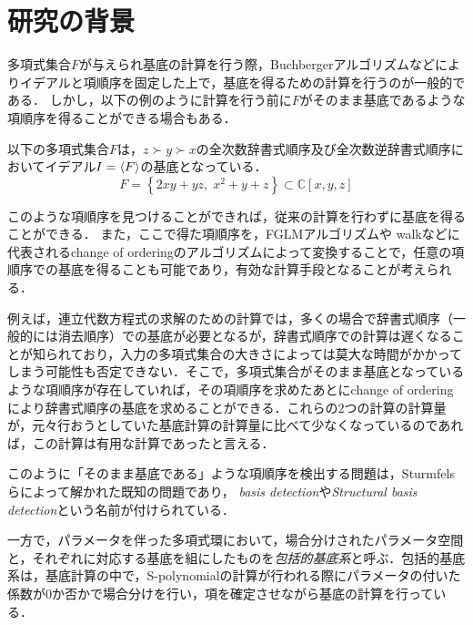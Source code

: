 \section{研究の背景}
多項式集合$F$が与えられ\groebner{}基底の計算を行う際，Buchbergerアルゴリズム\cite{buchberger2006bruno}などによりイデアルと項順序を固定した上で，\groebner{}基底を得るための計算を行うのが一般的である．
しかし，以下の例のように計算を行う前に$F$がそのまま\groebner{}基底であるような項順序を得ることができる場合もある．
\begin{example}
	以下の多項式集合$F$は，$z \succ y \succ x$の全次数辞書式順序及び全次数逆辞書式順序においてイデアル$I = \langle F \rangle$の\groebner{}基底となっている．
	$$F = \left\{ 2xy + yz, \; x^2 + y + z \right\} \subset \mathbb{C}[x, y, z]$$
\end{example}
このような項順序を見つけることができれば，従来の計算を行わずに\groebner{}基底を得ることができる．
また，ここで得た項順序を，FGLMアルゴリズム\cite{faugere1993efficient}や\groebner{} walk\cite{collart1993grobner}などに代表されるchange of orderingのアルゴリズムによって変換することで，任意の項順序での\groebner{}基底を得ることも可能であり，有効な計算手段となることが考えられる．
\par
例えば，連立代数方程式の求解のための計算では，多くの場合で辞書式順序（一般的には消去順序）での\groebner{}基底が必要となるが，辞書式順序での計算は遅くなることが知られており，入力の多項式集合の大きさによっては莫大な時間がかかってしまう可能性も否定できない．そこで，多項式集合がそのまま\groebner{}基底となっているような項順序が存在していれば，その項順序を求めたあとにchange of orderingにより辞書式順序の\groebner{}基底を求めることができる．これらの$2$つの計算の計算量が，元々行おうとしていた\groebner{}基底計算の計算量に比べて少なくなっているのであれば，この計算は有用な計算であったと言える．
\par
このように「そのまま\groebner{}基底である」ような項順序を検出する問題は，Sturmfelsらによって解かれた既知の問題であり，\emph{\groebner{} basis detection}\cite{gritzmann1993minkowski}や\emph{Structural \groebner{} basis detection}\cite{sturmfels1997structural}という名前が付けられている．
\par
一方で，パラメータを伴った多項式環において，場合分けされたパラメータ空間と，それぞれに対応する\groebner{}基底を組にしたものを\emph{包括的\groebner{}基底系}\cite{weispfenning1992comprehensive}と呼ぶ．包括的\groebner{}基底系は，\groebner{}基底計算の中で，\textrm{S-polynomial}の計算が行われる際にパラメータの付いた係数が$0$か否かで場合分けを行い，項を確定させながら\groebner{}基底の計算を行っている．
